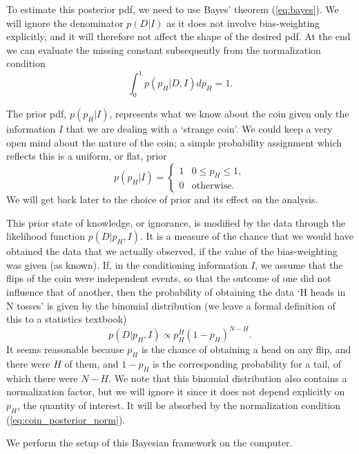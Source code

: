 \documentclass[%
oneside,                 %
final,                   %
10pt]{article}
\begin{document}
To estimate this posterior pdf, we need to use Bayes’ theorem (\ref{eq:bayes}). We will ignore the denominator $p(D|I)$ as it does not involve bias-weighting explicitly, and it will therefore not affect the shape of the desired pdf. At the end we can evaluate the missing constant subsequently from the normalization condition 
\begin{equation}
\int_0^1 p(p_H|D,I) dp_H = 1.
\label{eq:coin_posterior_norm}
\end{equation}

The prior pdf, $p(p_H|I)$, represents what we know about the coin given only the information $I$ that we are dealing with a ‘strange coin’. We could keep a very open mind about the nature of the coin; a simple probability assignment which reflects this is a uniform, or flat, prior
\begin{equation}
p(p_H|I) = \left\{ \begin{array}{ll}
1 & 0 \le p_H \le 1, \\
0 & \mathrm{otherwise}.
\end{array} \right.
\label{eq:coin_prior_uniform}
\end{equation}
We will get back later to the choice of prior and its effect on the analysis.

This prior state of knowledge, or ignorance, is modified by the data through the likelihood function $p(D|p_H,I)$. It is a measure of the chance that we would have obtained the data that we actually observed, if the value of the bias-weighting was given (as known). If, in the conditioning information $I$, we assume that the flips of the coin were independent events, so that the outcome of one did not influence that of another, then the probability of obtaining the data `H heads in N tosses' is given by the binomial distribution (we leave a formal definition of this to a statistics textbook)
\begin{equation}
p(D|p_H,I) \propto p_H^H (1-p_H)^{N-H}.
\end{equation}
It seems reasonable because $p_H$ is the chance of obtaining a head on any flip, and there were $H$ of them, and $1-p_H$ is the corresponding probability for a tail, of which there were $N-H$. We note that this binomial distribution also contains a normalization factor, but we will ignore it since it does not depend explicitly on $p_H$, the quantity of interest. It will be absorbed by the normalization condition (\ref{eq:coin_posterior_norm}).

We perform the setup of this Bayesian framework on the computer.
\end{document}
